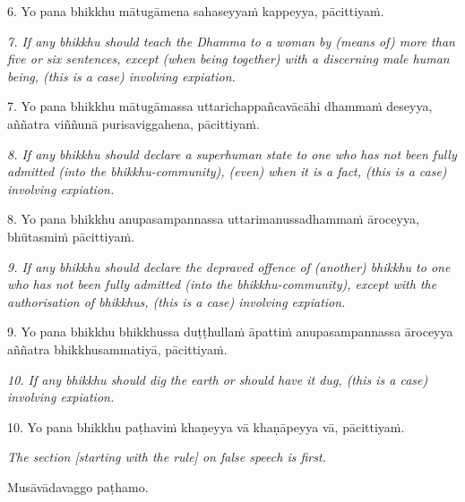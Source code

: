 \documentclass[11pt]{article}
\begin{document}
\begin{paracol}{2}
\begin{column}
\begin{flushleft}
6. Yo pana bhikkhu mātugāmena sahaseyyaṁ kappeyya, pācittiyaṁ.
\switchcolumn*
\end{flushleft}

{\itshape\footnotesize
7. If any bhikkhu should teach the Dhamma to a woman by (means of) more than five or six sentences, except (when being together) with a discerning male human being, (this is a case) involving expiation.
}
\switchcolumn

\begin{flushleft}
7. Yo pana bhikkhu mātugāmassa uttarichappañcavācāhi dhammaṁ deseyya, aññatra viññunā purisaviggahena, pācittiyaṁ.
\switchcolumn*
\end{flushleft}

{\itshape\footnotesize
8. If any bhikkhu should declare a superhuman state to one who has not been fully admitted (into the bhikkhu-community), (even) when it is a fact, (this is a case) involving expiation.
}
\switchcolumn

\begin{flushleft}
8. Yo pana bhikkhu anupasampannassa uttarimanussadhammaṁ āroceyya, bhūtasmiṁ pācittiyaṁ.
\switchcolumn*
\end{flushleft}

{\itshape\footnotesize
9. If any bhikkhu should declare the depraved offence of (another) bhikkhu to one who has not been fully admitted (into the bhikkhu-community), except with the authorisation of bhikkhus, (this is a case) involving expiation.
}
\switchcolumn

\begin{flushleft}
9. Yo pana bhikkhu bhikkhussa duṭṭhullaṁ āpattiṁ anupasampannassa āroceyya aññatra bhikkhusammatiyā, pācittiyaṁ.
\switchcolumn*
\end{flushleft}

{\itshape\footnotesize
10. If any bhikkhu should dig the earth or should have it dug, (this is a case) involving expiation.
}
\switchcolumn

\begin{flushleft}
10. Yo pana bhikkhu paṭhaviṁ khaṇeyya vā khaṇāpeyya vā, pācittiyaṁ.
\switchcolumn*
\end{flushleft}

{\itshape\footnotesize
The section [starting with the rule] on false speech is first.
}
\switchcolumn

\begin{flushleft}
Musāvādavaggo paṭhamo.
\switchcolumn*
\end{flushleft}


\end{column}
\end{paracol}
\end{document}
